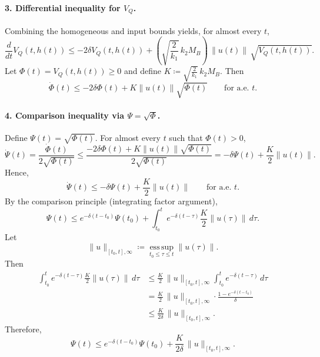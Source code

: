 \documentclass[10pt]{article} %
\theoremstyle{definition}
\begin{document}
\paragraph{3. Differential inequality for $V_Q$.}
Combining the homogeneous and input bounds yields, for almost every $t$,
\begin{equation} \label{eq:diff_ineq_Vq_sec5}
\frac{d}{dt} V_Q(t, h(t))
\le
-2\delta V_Q(t, h(t))
+
\left(\sqrt{\frac{2}{k_1}}\,k_2 M_B\right)\, \|u(t)\|\, \sqrt{V_Q(t, h(t))}.
\end{equation}
Let $\Phi(t)=V_Q(t,h(t))\ge 0$ and define $K \coloneqq \sqrt{\frac{2}{k_1}}\,k_2 M_B$. Then
\begin{equation}
\dot{\Phi}(t) \le -2\delta \Phi(t) + K \|u(t)\| \sqrt{\Phi(t)}
\qquad \text{for a.e.\ } t.
\end{equation}

\paragraph{4. Comparison inequality via $\Psi=\sqrt{\Phi}$.}
Define $\Psi(t)=\sqrt{\Phi(t)}$. For almost every $t$ such that $\Phi(t)>0$,
\[
\dot{\Psi}(t)=\frac{\dot{\Phi}(t)}{2\sqrt{\Phi(t)}}
\le
\frac{-2\delta \Phi(t) + K\|u(t)\|\sqrt{\Phi(t)}}{2\sqrt{\Phi(t)}}
=
-\delta \Psi(t) + \frac{K}{2}\|u(t)\|.
\]
Hence,
\begin{equation}
\dot{\Psi}(t) \le -\delta \Psi(t) + \frac{K}{2}\|u(t)\|
\qquad \text{for a.e.\ } t.
\end{equation}
By the comparison principle (integrating factor argument),
\begin{equation} \label{eq:comparison_principle_sec5}
\Psi(t) \le e^{-\delta (t-t_0)} \Psi(t_0)
+ \int_{t_0}^t e^{-\delta(t-\tau)} \frac{K}{2} \|u(\tau)\|\, d\tau .
\end{equation}
Let
\[
\|u\|_{[t_0,t],\infty}
\coloneqq \operatorname*{ess\,sup}_{t_0 \le \tau \le t}\|u(\tau)\|.
\]
Then
\begin{align*}
\int_{t_0}^t e^{-\delta(t-\tau)} \frac{K}{2} \|u(\tau)\|\, d\tau
&\le \frac{K}{2}\, \|u\|_{[t_0,t],\infty} \int_{t_0}^t e^{-\delta(t-\tau)}\, d\tau \\
&= \frac{K}{2}\, \|u\|_{[t_0,t],\infty}\cdot \frac{1-e^{-\delta(t-t_0)}}{\delta} \\
&\le \frac{K}{2\delta}\, \|u\|_{[t_0,t],\infty}.
\end{align*}
Therefore,
\begin{equation}
\Psi(t) \le e^{-\delta (t-t_0)} \Psi(t_0) + \frac{K}{2\delta}\, \|u\|_{[t_0,t],\infty}.
\end{equation}
\end{document}

